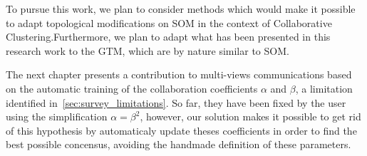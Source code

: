 	To pursue this work, we plan to consider methods which would make it possible to adapt topological modifications on SOM in the context of Collaborative Clustering.\@ Furthermore, we plan to adapt what has been presented in this research work to the GTM, which are by nature similar to SOM.\@

    The next chapter presents a contribution to multi-views communications based on the automatic training of the collaboration coefficients $\alpha$ and $\beta$, a limitation identified in~\ref{sec:survey_limitations}. So far, they have been fixed by the user using the simplification $\alpha = \beta^2$, however, our solution makes it possible to get rid of this hypothesis by automaticaly update theses coefficients in order to find the best possible concensus, avoiding the handmade definition of these parameters.
